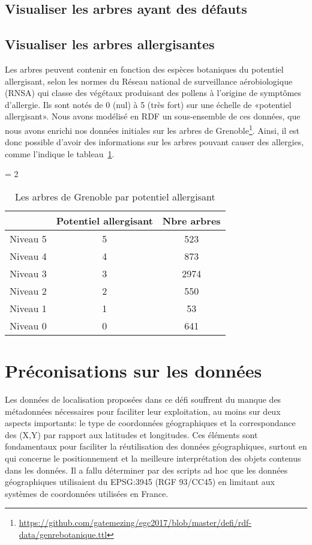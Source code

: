 \documentclass[a4paper,pagenum,french,showlayout]{rnti}
\begin{document}
\subsection{Visualiser les arbres ayant des défauts}

\subsection{Visualiser les arbres allergisantes}
Les arbres peuvent contenir en fonction des espèces botaniques du potentiel allergisant, selon les normes du Réseau national de surveillance aérobiologique (RNSA) qui classe des végétaux produisant des pollens à l'origine de symptômes d'allergie. Ils sont notés de 0 (nul) à 5 (très fort) sur une échelle de «potentiel allergisant». Nous avons modélisé en RDF un sous-ensemble de ces données, que nous avons enrichi nos données initiales sur les arbres de Grenoble\footnote{\url{https://github.com/gatemezing/egc2017/blob/master/defi/rdf-data/genrebotanique.ttl}}. Ainsi, il est donc possible d'avoir des informations sur les arbres pouvant causer des allergies, comme l'indique le tableau~\ref{tab_allergie}.

\begin{table}[ht]
 \begin{center}
   \tabcolsep = 2\tabcolsep
   \begin{tabular}{lcc}
   \hline\hline
                & Potentiel allergisant & Nbre arbres \\
   \hline
   Niveau 5 & 5        & 523       \\
   Niveau 4  & 4        & 873        \\
   Niveau 3 & 3       & 2974        \\
   Niveau 2 & 2       & 550        \\
   Niveau 1 & 1       & 53        \\
   Niveau 0 & 0       & 641        \\
   \hline
   \end{tabular}
\caption{Les arbres de Grenoble par potentiel allergisant} \label{tab_allergie}
 \end{center}
\end{table}

\section{Préconisations sur les données}
Les données de localisation proposées dans ce défi souffrent du manque des métadonnées nécessaires pour faciliter leur exploitation, au moins sur deux aspects importants: le type de coordonnées géographiques et la correspondance des (X,Y) par rapport aux latitudes et longitudes. Ces éléments sont fondamentaux pour faciliter la réutilisation des données géographiques, surtout en qui concerne le positionnement et la meilleure interprétation des objets contenus dans les données. Il a fallu déterminer par des scripts ad hoc que les données géographiques utilisaient du EPSG:3945 (RGF 93/CC45) en limitant aux systèmes de coordonnées utilisées en France. 
\end{document}

